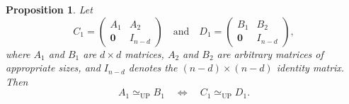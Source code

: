\documentclass[10pt,a4paper]{amsart}
\newtheorem{prop}{Proposition}
\begin{document}
\begin{prop}\label{prop-up-pry}
Let
\[
C_1 = \begin{pmatrix}
A_1 & A_2 \\
\mathbf{0} & I_{n-d}
\end{pmatrix}
\quad \text{and} \quad
D_1 = \begin{pmatrix}
B_1 & B_2 \\
\mathbf{0} & I_{n-d}
\end{pmatrix},
\]
where $A_1$ and $B_1$ are $d \times d$ matrices, $A_2$ and $B_2$ are arbitrary matrices of appropriate sizes, and $I_{n-d}$ denotes the $(n-d) \times (n-d)$ identity matrix. Then
\begin{equation}\label{equ-up-pyr}
A_1 \simeq_{\mathrm{UP}} B_1 \quad \Longleftrightarrow \quad C_1 \simeq_{\mathrm{UP}} D_1.
\end{equation}
\end{prop}
\end{document}
